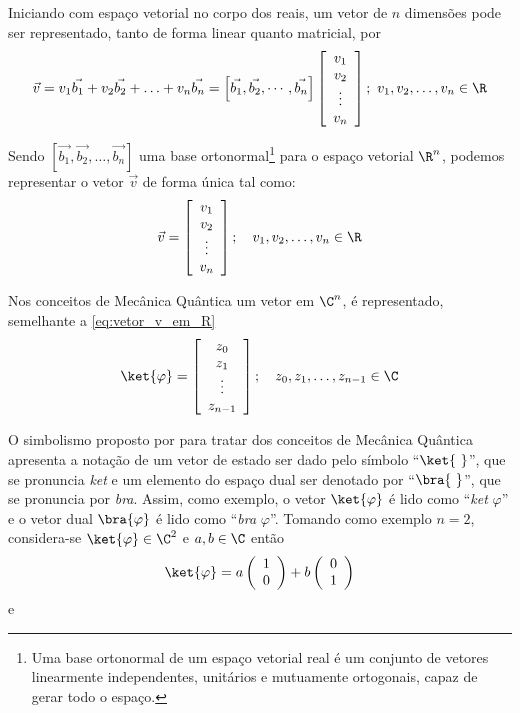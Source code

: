 Iniciando com espaço vetorial no corpo dos reais, um vetor de $n$ dimensões pode ser representado, tanto de forma linear quanto matricial, por
$$
    \vec{v} = v_1\vec{b_1}+v_2\vec{b_2}+\ldots+v_n\vec{b_n}=\left[\vec{b_1}, \vec{b_2},\cdots, \vec{b_n}\right]\left[\begin{array}{c}
         v_1\\
         v_2\\ 
         \vdots\\
         v_n
    \end{array}\right];\ v_1, v_2,\ldots, v_n \in \R
$$

Sendo $\left[\vec{b_1}, \vec{b_2},\dots, \vec{b_n}\right]$ uma base ortonormal\footnote{Uma base ortonormal de um espaço vetorial real é um conjunto de vetores linearmente independentes, unitários e mutuamente ortogonais, capaz de gerar todo o espaço.} para o espaço vetorial $\R^n$, podemos representar o vetor $\vec{v}$ de forma única tal como:
\begin{equation}
    \label{eq:vetor_v_em_R}
    \vec{v}=\left[\begin{array}{c}
         v_1\\
         v_2\\ 
         \vdots\\
         v_n
    \end{array}\right];\quad v_1, v_2,\ldots, v_n \in \R
\end{equation} 

Nos conceitos de Mecânica Quântica um vetor em $\C^n$, é representado, semelhante a \autoref{eq:vetor_v_em_R}
$$
    \label{eq:vetor_em_C}
    \ket{\varphi} = \left[\begin{array}{c}
         z_0 \\
         z_1 \\
         \vdots \\
         z_{n-1}
    \end{array}\right];\quad z_0,z_1,\ldots, z_{n-1}\in\C
$$

O simbolismo proposto por \textcite{dirac1981principles} para tratar dos conceitos de Mecânica Quântica apresenta a notação de um vetor de estado ser dado pelo símbolo ``$\ket{\ }$'', que se pronuncia \textit{ket} e um elemento do espaço dual ser denotado por ``$\bra{\ }$'', que se pronuncia por \textit{bra}. Assim, como exemplo, o vetor $\ket{\varphi}$ é lido como ``\textit{ket} $\varphi$'' e o vetor dual $\bra{\varphi}$ é lido como ``\textit{bra} $\varphi$''. Tomando como exemplo $n=2$, considera-se $\ket{\varphi}\in\C^2$ e $a,b\in\C$ então
\begin{equation}\label{eq:varphi_matricial}
    \ket{\varphi}=a\left(\begin{array}{c}
         1 \\ 
         0
    \end{array}\right)+b\left(\begin{array}{c}
         0 \\
         1
    \end{array}\right)
\end{equation}
\noindent e 

